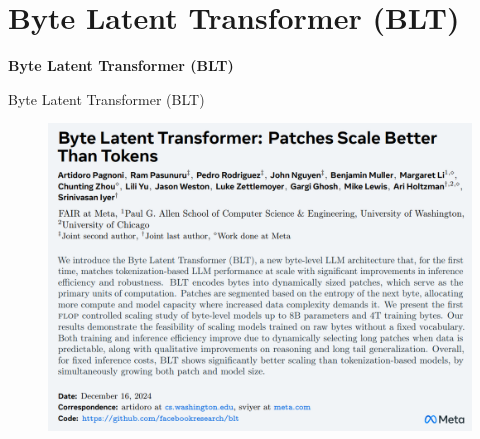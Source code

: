 \section{Byte Latent Transformer (BLT)}
\begin{frame}{}
    \LARGE \textbf{Byte Latent Transformer (BLT)}
\end{frame}

\begin{frame}[allowframebreaks]{Byte Latent Transformer (BLT)}
    \begin{figure}
        \centering
        \includegraphics[height=0.9\textheight,width=1.05\textwidth,keepaspectratio]{images/recent-advance/blt-paper.png}
    \end{figure}


\end{frame}
